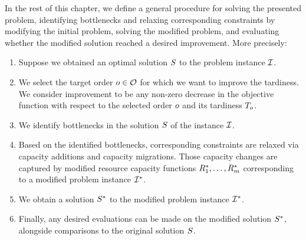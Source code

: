 In the rest of this chapter, we define a general procedure for solving the presented problem,
identifying bottlenecks and relaxing corresponding constraints by modifying the initial problem,
solving the modified problem,
and evaluating whether the modified solution reached a desired improvement.
More precisely:

\begin{enumerate}
    \item Suppose we obtained an optimal solution $S$ to the problem instance $\mathcal{I}$.

    \item We select the target order $o \in \mathcal{O}$ for which we want to improve the tardiness.
        We consider improvement to be any non-zero decrease in the objective function with respect to the
        selected order $o$ and its tardiness $T_{o}$.

    \item We identify bottlenecks in the solution $S$ of the instance $\mathcal{I}$.

    \item Based on the identified bottlenecks, corresponding constraints are relaxed via
        capacity additions and capacity migrations.
        Those capacity changes are captured by modified resource capacity functions
        $R_{1}^*, \ldots, R_{m}^*$
        corresponding to a modified problem instance $\mathcal{I}^*$.

    \item We obtain a solution $S^*$ to the modified problem instance $\mathcal{I}^*$.

    \item Finally, any desired evaluations can be made on the modified solution $S^*$,
        alongside comparisons to the original solution $S$.
\end{enumerate}
